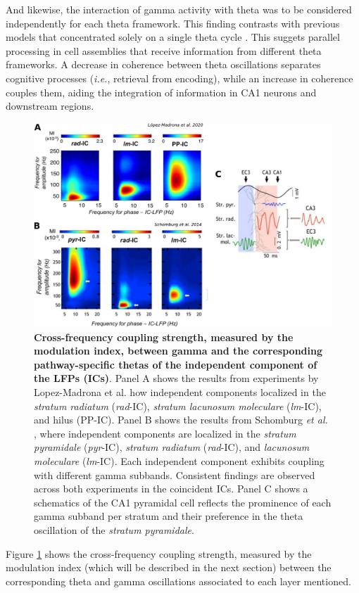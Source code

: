 \documentclass[../main.tex]{subfiles}
\begin{document}
And likewise, the interaction of gamma activity with theta was to be considered independently for each theta framework.
This finding contrasts with previous models that concentrated solely on a single theta cycle \citep{lopes2018parsing,dvorak2018control,zhang2019sub}.
This suggets parallel processing in cell assemblies that receive information from different theta frameworks.
A decrease in coherence between theta oscillations separates cognitive processes (\textit{i.e.}, retrieval from encoding), while an increase in coherence couples them, aiding the integration of information in CA1 neurons and downstream regions.
\begin{figure}[!htb]
    \centering
    \includegraphics[width=\textwidth]{chapter4/figures/modulation-index-examples.png}
    \caption{\textbf{Cross-frequency coupling strength, measured by the modulation index, between gamma and the corresponding pathway-specific thetas of the independent component of the LFPs (ICs)}.
    Panel A shows the results from experiments by Lopez-Madrona et al. \citep{lopez-madrona_different_2020} how independent components localized in the \textit{stratum radiatum} (\textit{rad}-IC), \textit{stratum lacunosum moleculare} (\textit{lm}-IC), and hilus (PP-IC).
    Panel B shows the results from Schomburg \textit{et al.} \citep{schomburg_theta_2014}, where independent components are localized in the \textit{stratum pyramidale} (\textit{pyr}-IC), \textit{stratum radiatum} (\textit{rad}-IC), and \textit{lacunosum moleculare} (\textit{lm}-IC).
    Each independent component exhibits coupling with different gamma subbands.
    Consistent findings are observed across both experiments in the coincident ICs.
    Panel C shows a schematics of the CA1 pyramidal cell reflects the prominence of each gamma subband per stratum and their preference in the theta oscillation of the \textit{stratum pyramidale}.}
    \label{fig:modulation-index-IC}
\end{figure}
Figure \ref{fig:modulation-index-IC} shows the cross-frequency coupling strength, measured by the modulation index (which will be described in the next section) between the corresponding theta and gamma oscillations associated to each layer mentioned.
\end{document}
